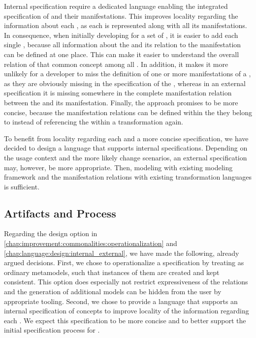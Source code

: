 Internal specification require a dedicated language enabling the integrated specification of \commonalities and their manifestations.
This improves locality regarding the information about each \commonality, as each \commonality is represented along with all its manifestations.
In consequence, when initially developing \commonalities for a set of \concretemetamodels, it is easier to add each single \commonality, because all information about the \commonality and its relation to the manifestation can be defined at one place.
This can make it easier to understand the overall relation of that common concept among all \concretemetamodels.
In addition, it makes it more unlikely for a developer to miss the definition of one or more manifestations of a \commonality, as they are obviously missing in the specification of the \commonality, whereas in an external specification it is missing somewhere in the complete manifestation relation between the \conceptmetamodel and its manifestation.
Finally, the approach promises to be more concise, because the manifestation relations can be defined within the \commonality they belong to instead of referencing the \commonality within a transformation again.

To benefit from locality regarding each \commonality and a more concise specification, we have decided to design a language that supports internal specifications.
Depending on the usage context and the more likely change scenarios, an external specification may, however, be more appropriate.
Then, modeling \concretemetamodels with existing modeling framework and the manifestation relations with existing transformation languages is sufficient.


\subsection{Artifacts and Process}

Regarding the design option in \autoref{chap:improvement:commonalities:operationalization} and \autoref{chap:language:design:internal_external}, we have made the following, already argued decisions.
First, we chose to operationalize a specification by treating \conceptmetamodels as ordinary metamodels, such that instances of them are created and kept consistent.
This option does especially not restrict expressiveness of the relations and the generation of additional models can be hidden from the user by appropriate tooling.
Second, we chose to provide a language that supports an internal specification of concepts to improve locality of the information regarding each \commonality.
We expect this specification to be more concise and to better support the initial specification process for \commonalities.

